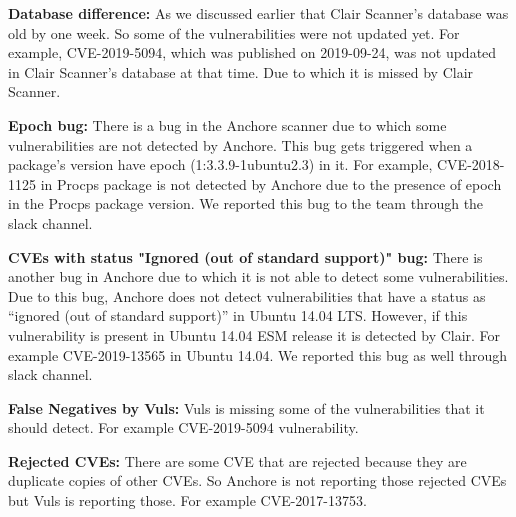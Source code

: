 \documentclass[a4paper,num-refs]{oup-contemporary}
\begin{document}
\textbf{Database difference:} As we discussed earlier that Clair Scanner's database was old by one week.
                So some of the vulnerabilities were not updated yet. For example, CVE-2019-5094, which
		was published on 2019-09-24, was not 
		updated in Clair Scanner's database at that time. Due to which it is missed by Clair Scanner.


\textbf{Epoch bug:} There is a bug in the Anchore scanner due to which some vulnerabilities are 
		not detected by Anchore. This bug gets triggered when a package’s version have epoch 
		(1:3.3.9-1ubuntu2.3) in it. For example, CVE-2018-1125 in Procps package is not
		detected by Anchore due to the presence of epoch in the Procps package version.
		We reported this bug to the team through the slack channel.

\textbf{CVEs with status "Ignored (out of standard support)" bug:} There is another bug in Anchore due to 
		which it is not able to detect some vulnerabilities. Due to this bug, Anchore does not detect 
		vulnerabilities that have a status as “ignored (out of standard support)” in Ubuntu 14.04 LTS. 
		However, if this vulnerability is present in Ubuntu 14.04 ESM release it is detected by Clair. 
		For example CVE-2019-13565 in Ubuntu 14.04. We reported this bug as well through slack
		channel.


\textbf{False Negatives by Vuls:} Vuls is missing some of the vulnerabilities that it should detect. 
		For example CVE-2019-5094 vulnerability.

\textbf{Rejected CVEs:} There are some CVE that are rejected because they are duplicate copies of other CVEs. 
	So Anchore is not reporting those rejected CVEs but Vuls is reporting those. For example CVE-2017-13753.
\end{document}
